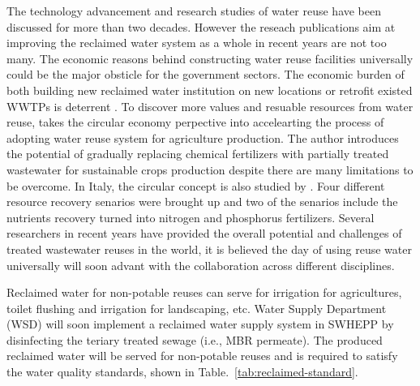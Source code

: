 The technology advancement and research studies of water reuse have been discussed for more than two decades. However the reseach publications aim at improving the reclaimed water system as a whole in recent years are not too many. The economic reasons behind constructing water reuse facilities universally could be the major obsticle for the government sectors. The economic burden of both building new reclaimed water institution on new locations or retrofit existed WWTPs is deterrent \citep{adewumiTreatedWastewaterReuse2010}. To discover more values and resuable resources from water reuse, \citet{chojnackaTransitionConventionalIrrigation2020} takes the circular economy perpective into accelearting the process of adopting water reuse system for agriculture production. The author introduces the potential of gradually replacing chemical fertilizers with partially treated wastewater for sustainable crops production despite there are many limitations to be overcome. In Italy, the circular concept is also studied by \citet{colellaChallengesOpportunitiesMore2021}. Four different resource recovery senarios were brought up and two of the senarios include the nutrients recovery turned into nitrogen and phosphorus fertilizers. Several researchers in recent years have provided the overall potential and challenges of treated wastewater reuses in the world, it is believed the day of using reuse water universally will soon advant with the collaboration across different disciplines. 


Reclaimed water for non-potable reuses can serve for irrigation for agricultures, toilet flushing and irrigation for landscaping, etc. Water Supply Department (WSD) will soon implement a reclaimed water supply system in SWHEPP by disinfecting the teriary treated sewage (i.e., MBR permeate). The produced reclaimed water will be served for non-potable reuses and is required to satisfy the water quality standards, shown in Table.~\ref{tab:reclaimed-standard}.


